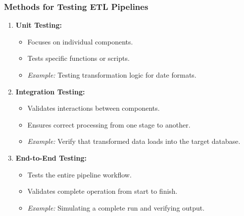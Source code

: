 \documentclass[aspectratio=169]{beamer}
\begin{document}
\begin{frame}[fragile]
    \frametitle{Methods for Testing ETL Pipelines}
    
    \begin{enumerate}
        \item \textbf{Unit Testing:}
        \begin{itemize}
            \item Focuses on individual components.
            \item Tests specific functions or scripts.
            \item \textit{Example:} Testing transformation logic for date formats.
        \end{itemize}
        
        \item \textbf{Integration Testing:}
        \begin{itemize}
            \item Validates interactions between components.
            \item Ensures correct processing from one stage to another.
            \item \textit{Example:} Verify that transformed data loads into the target database.
        \end{itemize}
        
        \item \textbf{End-to-End Testing:}
        \begin{itemize}
            \item Tests the entire pipeline workflow.
            \item Validates complete operation from start to finish.
            \item \textit{Example:} Simulating a complete run and verifying output.
        \end{itemize}
    \end{enumerate}
\end{frame}
\end{document}
